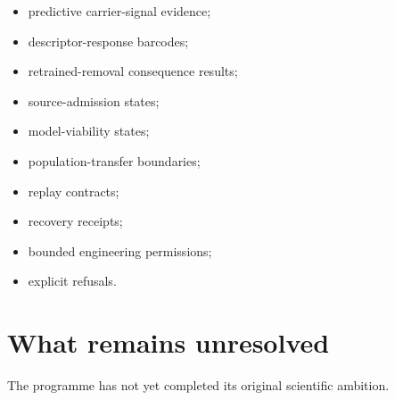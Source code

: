 \documentclass[11pt,a4paper,oneside]{report}
\begin{document}
\begin{itemize}



\item

predictive carrier-signal evidence;



\item

descriptor-response barcodes;



\item

retrained-removal consequence results;



\item

source-admission states;



\item

model-viability states;



\item

population-transfer boundaries;



\item

replay contracts;



\item

recovery receipts;



\item

bounded engineering permissions;



\item

explicit refusals.



\end{itemize}





\section{What remains unresolved}



The programme has not yet completed its original scientific ambition.
\end{document}
